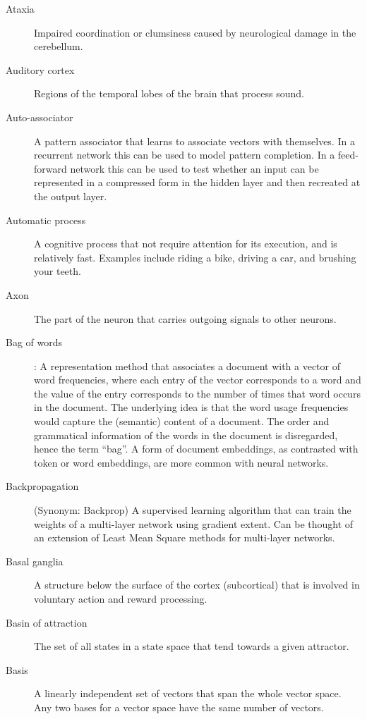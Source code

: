 \begin{description}
\item[Ataxia] Impaired coordination or clumsiness caused by neurological damage in the cerebellum.

\item[Auditory cortex] Regions of the temporal lobes of the brain that process sound. 

\item[Auto-associator] A pattern associator that learns to associate vectors with themselves. In a recurrent network this can be used to model pattern completion. In a feed-forward network this can be used to test whether an input can be represented in a compressed form in the hidden layer and then recreated at the output layer. 

\item[Automatic process] A cognitive process that not require attention for its execution, and is relatively fast. Examples include riding a bike, driving a car, and brushing your teeth.

\item[Axon] The part of the neuron that carries outgoing signals to other neurons.

\item[Bag of words]: A representation method that associates a document with a vector of word frequencies, where each entry of the vector corresponds to a word and the value of the entry corresponds to the number of times that word occurs in the document. The underlying idea is that the word usage frequencies would capture the (semantic) content of a document. The order and grammatical information of the words in the document is disregarded, hence the term ``bag''.  A form of document embeddings, as contrasted with token or word embeddings, are more common with neural networks.

\item[Backpropagation] (Synonym: Backprop) A supervised learning algorithm that can train the weights of a multi-layer network using gradient extent. Can be thought of an extension of Least Mean Square methods for multi-layer networks. 

\item[Basal ganglia] A structure below the surface of the cortex (subcortical) that is involved in voluntary action and reward processing.

\item[Basin of attraction] The set of all states in a state space that tend 
towards a given attractor.

\item[Basis] A linearly independent set of vectors that span the whole vector space. Any two bases for a vector space have the same number of vectors.


\end{description}
